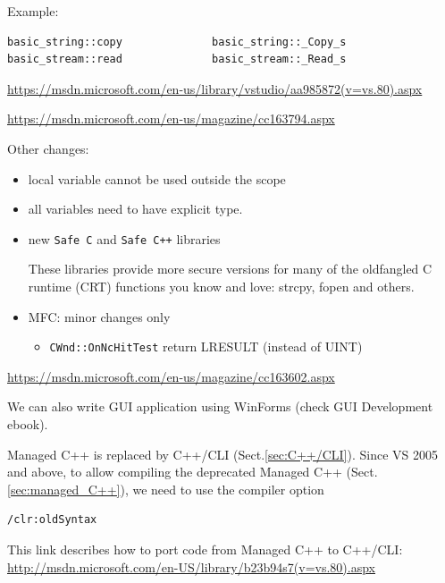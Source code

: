 Example: 
\begin{verbatim}
basic_string::copy              basic_string::_Copy_s
basic_stream::read              basic_stream::_Read_s
\end{verbatim}
\url{https://msdn.microsoft.com/en-us/library/vstudio/aa985872(v=vs.80).aspx}

\url{https://msdn.microsoft.com/en-us/magazine/cc163794.aspx}

Other changes:
\begin{itemize}
  \item local variable cannot be used outside the scope
  \item all variables need to have explicit type.
  \item new \verb!Safe C! and \verb!Safe C++! libraries
  
   These libraries provide more secure versions for many of the oldfangled C
   runtime (CRT) functions you know and love: strcpy, fopen and others.
   
   \item MFC: minor changes only
   \begin{itemize}
     \item \verb!CWnd::OnNcHitTest! return LRESULT (instead of UINT)
    \end{itemize}
\end{itemize}
\url{https://msdn.microsoft.com/en-us/magazine/cc163602.aspx}

We can also write GUI application using WinForms (check GUI Development ebook).


Managed C++ is replaced by C++/CLI (Sect.\ref{sec:C++/CLI}). 
Since VS 2005 and above, to allow compiling the deprecated Managed C++ (Sect.\ref{sec:managed_C++}), we need to use the compiler
option
\begin{verbatim}
/clr:oldSyntax
\end{verbatim}
This link describes how to port code from Managed C++ to C++/CLI:
\url{http://msdn.microsoft.com/en-US/library/b23b94s7(v=vs.80).aspx}








